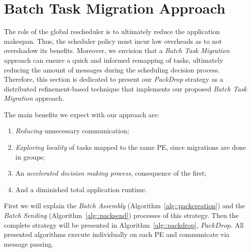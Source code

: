 \section{Batch Task Migration Approach} \label{sec:algo}



The role of the global rescheduler is to ultimately reduce the application makespan. 
Thus, the scheduler policy must incur low overheads as to not overshadow its benefits. 
Moreover, we envision that a \textit{Batch Task Migration} approach can ensure a quick and informed remapping of tasks, ultimately reducing the amount of messages during the scheduling decision process. 
Therefore, this section is dedicated to present our \textit{PackDrop} strategy as a distributed refinement-based technique that implements our proposed \textit{Batch Task Migration} approach.

The main benefits we expect with our approach are: 
\begin{enumerate}
	\item \textit{Reducing} unnecessary communication;
	\item \textit{Exploring locality} of tasks mapped to the same PE, since migrations are done in groups;
	\item An \textit{accelerated decision making process}, consequence of the first;
	\item And a diminished total application runtime.
\end{enumerate}

First we will explain the \textit{Batch Assembly} (Algorithm~\ref{alg::packcreation}) and the \textit{Batch Sending} (Algorithm~\ref{alg::packsend}) processes of this strategy.
Then the complete strategy will be presented in Algorithm~\ref{alg::packdrop}, $PackDrop$.
All presented algorithms execute individually on each PE and communicate via message passing.

